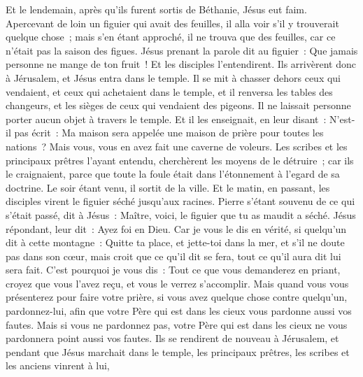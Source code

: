 \begin{multicols}{2}
Et le lendemain, après qu'ils furent sortis de Béthanie, Jésus eut faim.
Apercevant de loin un figuier qui avait des feuilles, il alla voir s'il y trouverait quelque chose~; mais s'en étant approché, il ne trouva que des feuilles, car ce n'était pas la saison des figues.
Jésus prenant la parole dit au figuier~: Que jamais personne ne mange de ton fruit~! Et les disciples l'entendirent.
Ils arrivèrent donc à Jérusalem, et Jésus entra dans le temple. Il se mit à chasser dehors ceux qui vendaient, et ceux qui achetaient dans le temple, et il renversa les tables des changeurs, et les sièges de ceux qui vendaient des pigeons.
Il ne laissait personne porter aucun objet à travers le temple.
Et il les enseignait, en leur disant~: N'est-il pas écrit~: Ma maison sera appelée une maison de prière pour toutes les nations~? Mais vous, vous en avez fait une caverne de voleurs.
Les scribes et les principaux prêtres l'ayant entendu, cherchèrent les moyens de le détruire~; car ils le craignaient, parce que toute la foule était dans l'étonnement à l'egard de sa doctrine.
Le soir étant venu, il sortit de la ville.
Et le matin, en passant, les disciples virent le figuier séché jusqu'aux racines.
Pierre s'étant souvenu de ce qui s'était passé, dit à Jésus~: Maître, voici, le figuier que tu as maudit a séché.
Jésus répondant, leur dit~: Ayez foi en Dieu.
Car je vous le dis en vérité, si quelqu'un dit à cette montagne~: Quitte ta place, et jette-toi dans la mer, et s'il ne doute pas dans son cœur, mais croit que ce qu'il dit se fera, tout ce qu'il aura dit lui sera fait.
C'est pourquoi je vous dis~: Tout ce que vous demanderez en priant, croyez que vous l'avez reçu, et vous le verrez s'accomplir.
Mais quand vous vous présenterez pour faire votre prière, si vous avez quelque chose contre quelqu'un, pardonnez-lui, afin que votre Père qui est dans les cieux vous pardonne aussi vos fautes.
Mais si vous ne pardonnez pas, votre Père qui est dans les cieux ne vous pardonnera point aussi vos fautes.
Ils se rendirent de nouveau à Jérusalem, et pendant que Jésus marchait dans le temple, les principaux prêtres, les scribes et les anciens vinrent à lui,

\end{multicols}
